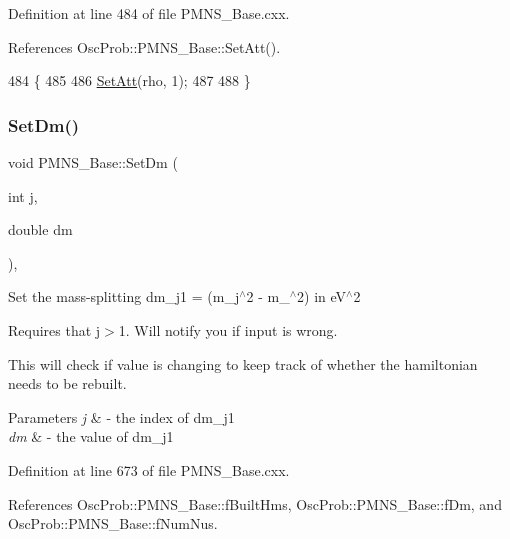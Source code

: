 Definition at line 484 of file P\+M\+N\+S\+\_\+\+Base.\+cxx.



References Osc\+Prob\+::\+P\+M\+N\+S\+\_\+\+Base\+::\+Set\+Att().


\begin{DoxyCode}
484                                                \{
485 
486   \hyperlink{classOscProb_1_1PMNS__Base_aba565962a440d14bee7a2a96d2eca2c5}{SetAtt}(rho, 1);
487 
488 \}
\end{DoxyCode}
\mbox{\label{classOscProb_1_1PMNS__Base_a492243b22fb1b783cd2943f507cff970}} 
\subsubsection{\texorpdfstring{Set\+Dm()}{SetDm()}}
{\footnotesize\ttfamily void P\+M\+N\+S\+\_\+\+Base\+::\+Set\+Dm (\begin{DoxyParamCaption}\item[{int}]{j,  }\item[{double}]{dm }\end{DoxyParamCaption})\hspace{0.3cm}{\ttfamily [virtual]}, {\ttfamily [inherited]}}

Set the mass-\/splitting dm\+\_\+j1 = (m\+\_\+j$^\wedge$2 -\/ m\+\_$^\wedge$2) in e\+V$^\wedge$2

Requires that j$>$1. Will notify you if input is wrong.

This will check if value is changing to keep track of whether the hamiltonian needs to be rebuilt.


\begin{DoxyParams}{Parameters}
{\em j} & -\/ the index of dm\+\_\+j1 \\
\hline
{\em dm} & -\/ the value of dm\+\_\+j1 \\
\hline
\end{DoxyParams}


Definition at line 673 of file P\+M\+N\+S\+\_\+\+Base.\+cxx.



References Osc\+Prob\+::\+P\+M\+N\+S\+\_\+\+Base\+::f\+Built\+Hms, Osc\+Prob\+::\+P\+M\+N\+S\+\_\+\+Base\+::f\+Dm, and Osc\+Prob\+::\+P\+M\+N\+S\+\_\+\+Base\+::f\+Num\+Nus.



